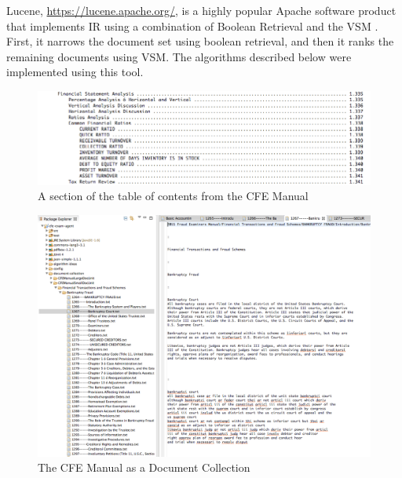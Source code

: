 Lucene, \url{https://lucene.apache.org/}, is a highly popular Apache software product that implements IR using a combination of Boolean Retrieval and the VSM \cite{McCandless:2010:LAS:1893016_ch1,McCandless:2010:LAS:1893016_ch2,McCandless:2010:LAS:1893016_ch3,McCandless:2010:LAS:1893016_ch4}.  First, it narrows the document set using boolean retrieval, and then it ranks the remaining documents using VSM.  The algorithms described below were implemented using this tool.  

\begin{figure}
\centering
\vspace{1.0in}
\includegraphics[width=150mm]{cfe_manual_toc.png}
\caption{A section of the table of contents from the CFE Manual}
\label{fig:cfe_manual_toc}
\end{figure}

\begin{figure}
\centering
\vspace{1.0in}
\includegraphics[width=150mm]{document_collection.png}
\caption{The CFE Manual as a Document Collection}
\label{fig:document_collection}
\end{figure}

